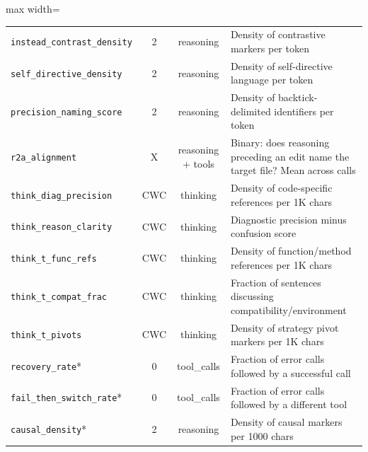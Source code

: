 \documentclass[11pt]{article}
\newcommand{\feat}[1]{\texttt{#1}}
\newcommand{\rtalign}{\feat{r2a\_alignment}}
\begin{document}
\begin{table}[t]
\begin{adjustbox}{max width=\textwidth}
\begin{tabular}{p{4cm}ccp{6.5cm}}
\feat{instead\_contrast\_density} & 2 & reasoning & Density of contrastive markers per token \\
\feat{self\_directive\_density} & 2 & reasoning & Density of self-directive language per token \\
\feat{precision\_naming\_score} & 2 & reasoning & Density of backtick-delimited identifiers per token \\
\rtalign{} & X & reasoning + tools & Binary: does reasoning preceding an edit name the target file? Mean across calls \\
\feat{think\_diag\_precision} & CWC & thinking & Density of code-specific references per 1K chars \\
\feat{think\_reason\_clarity} & CWC & thinking & Diagnostic precision minus confusion score \\
\feat{think\_t\_func\_refs}   & CWC & thinking & Density of function/method references per 1K chars \\
\feat{think\_t\_compat\_frac} & CWC & thinking & Fraction of sentences discussing compatibility/environment \\
\feat{think\_t\_pivots}       & CWC & thinking & Density of strategy pivot markers per 1K chars \\
\midrule
\feat{recovery\_rate}*         & 0 & tool\_calls & Fraction of error calls followed by a successful call \\
\feat{fail\_then\_switch\_rate}* & 0 & tool\_calls & Fraction of error calls followed by a different tool \\
\feat{causal\_density}*        & 2 & reasoning & Density of causal markers per 1000 chars \\
\bottomrule
\end{tabular}
\end{adjustbox}
\end{table}



\end{document}
